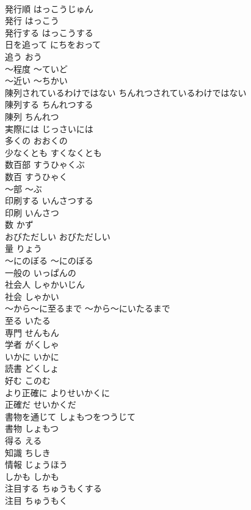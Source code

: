 \documentclass[8pt]{extreport}
\begin{document}
\begin{CJK}{UTF8}{min}
\\	発行順	はっこうじゅん	
\\	発行	はっこう	
\\	発行する	はっこうする	
\\	日を追って	にちをおって	
\\	追う	おう	
\\	〜程度	〜ていど	
\\	〜近い	〜ちかい	
\\	陳列されているわけではない	ちんれつされているわけではない	
\\	陳列する	ちんれつする	
\\	陳列	ちんれつ	
\\	実際には	じっさいには	
\\	多くの	おおくの	
\\	少なくとも	すくなくとも	
\\	数百部	すうひゃくぶ	
\\	数百	すうひゃく	
\\	〜部	〜ぶ	
\\	印刷する	いんさつする	
\\	印刷	いんさつ	
\\	数	かず	
\\	おびただしい	おびただしい	
\\	量	りょう	
\\	〜にのぼる	〜にのぼる	
\\	一般の	いっぱんの	
\\	社会人	しゃかいじん	
\\	社会	しゃかい	
\\	〜から〜に至るまで	〜から〜にいたるまで	
\\	至る	いたる	
\\	専門	せんもん	
\\	学者	がくしゃ	
\\	いかに	いかに	
\\	読書	どくしょ	
\\	好む	このむ	
\\	より正確に	よりせいかくに	
\\	正確だ	せいかくだ	
\\	書物を通じて	しょもつをつうじて	
\\	書物	しょもつ	
\\	得る	える	
\\	知識	ちしき	
\\	情報	じょうほう	
\\	しかも	しかも	
\\	注目する	ちゅうもくする	
\\	注目	ちゅうもく	

\end{CJK}
\end{document}
